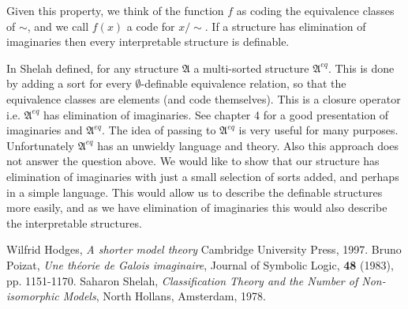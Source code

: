 \documentclass[12pt]{article}
\newcommand{\ma}{\mathfrak{A}}
\begin{document}
Given this property, we think of the function $f$ as coding the equivalence classes of $\sim$, and we call $f(x)$ a code for $x/\sim$. If a structure has elimination of imaginaries then every interpretable structure is definable. 

In \cite{Sh} Shelah defined, for any structure $\ma$ a multi-sorted structure $\ma^{eq}$. This is done by adding a sort for every $\emptyset$-definable equivalence relation, so that the equivalence classes are elements (and code themselves). This is a closure operator i.e. $\ma^{eq}$ has elimination of imaginaries. See \cite{HOD} chapter 4 for a good presentation of imaginaries and $\ma^{eq}$.
 The idea of passing to $\ma^{eq}$ is very useful for many purposes. Unfortunately $\ma^{eq}$ has an unwieldy language and theory. Also this approach does not answer the question above.  We would like to show that our structure has elimination of imaginaries with just a small selection of sorts added, and perhaps in a simple language. This would allow us to describe the definable structures more easily, and as we have elimination of imaginaries this would also describe the interpretable structures.

\begin{thebibliography}{9}
 Wilfrid Hodges, {\em A shorter model theory} Cambridge University Press, 1997.
 Bruno Poizat, {\em Une th\'eorie de Galois imaginaire}, Journal of Symbolic Logic, {\bf 48} (1983), pp. 1151-1170.
 Saharon Shelah, {\em Classification Theory and the Number of Non-isomorphic Models}, North Hollans, Amsterdam, 1978.
\end{thebibliography}
\end{document}
